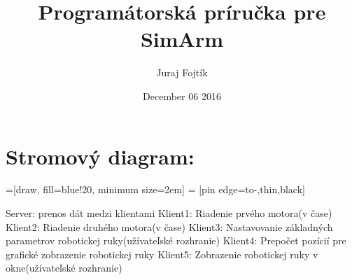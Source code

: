 \documentclass{article}
\title{Programátorská príručka pre SimArm}
\date{December 06 2016}
\author{Juraj Fojtí­k}
\begin{document}
\maketitle
\section{Stromový diagram:}
=[draw, fill=blue!20, minimum size=2em]
 = [pin edge={to-,thin,black}]
\newline\newline
Server: prenos dát medzi klientami\newline
Klient1: Riadenie prvého motora(v čase)\newline
Klient2: Riadenie druhého motora(v čase)\newline
Klient3: Nastavovanie základných parametrov robotickej ruky(užívateľské rozhranie)\newline
Klient4: Prepočet pozícií pre grafické zobrazenie robotickej ruky\newline
Klient5: Zobrazenie robotickej ruky v okne(užívateľské rozhranie) \newline\newline
\end{document}
